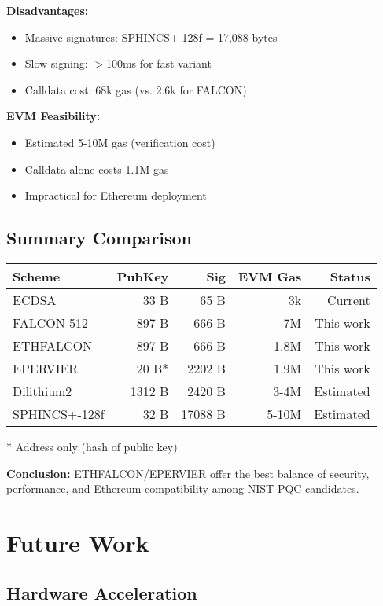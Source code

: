 \documentclass[11pt,a4paper]{article}
\begin{document}
\textbf{Disadvantages:}
\begin{itemize}
    \item Massive signatures: SPHINCS+-128f = 17,088 bytes
    \item Slow signing: $>$100ms for fast variant
    \item Calldata cost: 68k gas (vs. 2.6k for FALCON)
\end{itemize}

\textbf{EVM Feasibility:}
\begin{itemize}
    \item Estimated 5-10M gas (verification cost)
    \item Calldata alone costs 1.1M gas
    \item Impractical for Ethereum deployment
\end{itemize}

\subsection{Summary Comparison}

\begin{center}
\small
\begin{tabular}{lrrrr}
\hline
\textbf{Scheme} & \textbf{PubKey} & \textbf{Sig} & \textbf{EVM Gas} & \textbf{Status} \\
\hline
ECDSA & 33 B & 65 B & 3k & Current \\
FALCON-512 & 897 B & 666 B & 7M & This work \\
ETHFALCON & 897 B & 666 B & 1.8M & This work \\
EPERVIER & 20 B* & 2202 B & 1.9M & This work \\
Dilithium2 & 1312 B & 2420 B & 3-4M & Estimated \\
SPHINCS+-128f & 32 B & 17088 B & 5-10M & Estimated \\
\hline
\end{tabular}
\end{center}

* Address only (hash of public key)

\textbf{Conclusion:} ETHFALCON/EPERVIER offer the best balance of security, performance, and Ethereum compatibility among NIST PQC candidates.

\section{Future Work}

\subsection{Hardware Acceleration}
\end{document}
